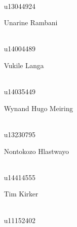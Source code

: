 \documentclass[a4paper,12pt]{report}
\begin{document}
\begin{titlepage}
\begin{center}
\begin{minipage}{0.4\textwidth}
\end{minipage}
\begin{minipage}{0.4\textwidth}
\begin{flushright} \large
\emph{} \\
u13044924
\end{flushright}
\end{minipage}
\begin{minipage}{0.4\textwidth}
\begin{flushleft} \large
Unarine {Rambani}
\end{flushleft}
\end{minipage}
\begin{minipage}{0.4\textwidth}
\begin{flushright} \large
\emph{} \\
u14004489
\end{flushright}
\end{minipage}
\begin{minipage}{0.4\textwidth}
\begin{flushleft} \large
Vukile {Langa}
\end{flushleft}
\end{minipage}
\begin{minipage}{0.4\textwidth}
\begin{flushright} \large
\emph{} \\
u14035449 
\end{flushright}
\end{minipage}
\begin{minipage}{0.4\textwidth}
\begin{flushleft} \large
Wynand Hugo Meiring
\end{flushleft}
\end{minipage}
\begin{minipage}{0.4\textwidth}
\begin{flushright} \large
\emph{} \\
u13230795  
\end{flushright}
\end{minipage}
\begin{minipage}{0.4\textwidth}
\begin{flushleft} \large
Nontokozo Hlastwayo
\end{flushleft}
\end{minipage}
\begin{minipage}{0.4\textwidth}
\begin{flushright} \large
\emph{} \\
u14414555
\end{flushright}
\end{minipage}
\begin{minipage}{0.4\textwidth}
\begin{flushleft} \large
Tim Kirker
\end{flushleft}
\end{minipage}
\begin{minipage}{0.4\textwidth}
\begin{flushright} \large
\emph{} \\
u11152402
\end{flushright}
\end{minipage}
\vfill


\end{center}
\end{titlepage}
\end{document}
